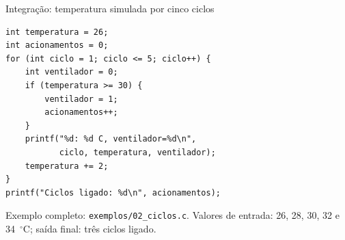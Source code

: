 \begin{frame}[fragile]{Integração: temperatura simulada por cinco ciclos}
\begin{lstlisting}
int temperatura = 26;
int acionamentos = 0;
for (int ciclo = 1; ciclo <= 5; ciclo++) {
    int ventilador = 0;
    if (temperatura >= 30) {
        ventilador = 1;
        acionamentos++;
    }
    printf("%d: %d C, ventilador=%d\n",
           ciclo, temperatura, ventilador);
    temperatura += 2;
}
printf("Ciclos ligado: %d\n", acionamentos);
\end{lstlisting}
\small Exemplo completo: \texttt{exemplos/02\_ciclos.c}. Valores de entrada: 26, 28, 30, 32 e 34~$^\circ$C; saída final: três ciclos ligado.
\end{frame}

